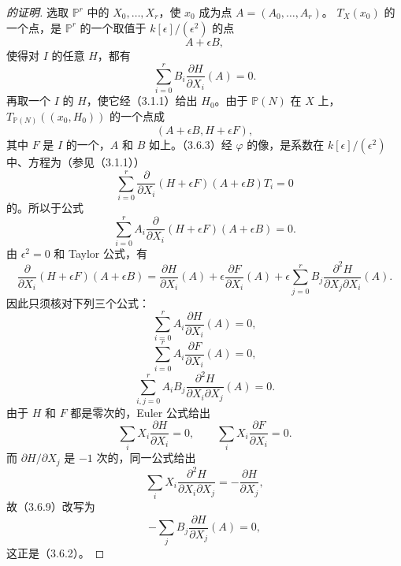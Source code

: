 \begin{proof}[的证明]
选取 $\mathbb P^r$ 中的 $X_0,\ldots,X_r$，使 $x_0$ 成为点 $A=(A_0,\ldots,A_r)$。
$T_X(x_0)$ 的一个点，是 $\mathbb P^r$ 的一个取值于 $k[\epsilon]/(\epsilon^2)$ 的点
\[
A+\epsilon B,\tag{3.6.1}
\]
使得对 $I$ 的任意 $H$，都有
\[
\sum_{i=0}^{r}B_i\frac{\partial H}{\partial X_i}(A)=0.\tag{3.6.2}
\]
再取一个 $I$ 的 $H$，使它经（3.1.1）给出 $H_0$。由于 $\mathbb P(N)$ 在 $X$ 上，$T_{\mathbb P(N)}((x_0,H_0))$ 的一个点成
\[
(A+\epsilon B,H+\epsilon F),\tag{3.6.3}
\]
其中 $F$ 是 $I$ 的一个，$A$ 和 $B$ 如上。（3.6.3）经 $\varphi$ 的像，是系数在 $k[\epsilon]/(\epsilon^2)$ 中、方程为（参见（3.1.1））
\[
\sum_{i=0}^{r}\frac{\partial}{\partial X_i}(H+\epsilon F)(A+\epsilon B)T_i=0
\tag{3.6.4}
\]
的。所以于公式
\[
\sum_{i=0}^{r}A_i\frac{\partial}{\partial X_i}(H+\epsilon F)(A+\epsilon B)=0.
\tag{3.6.5}
\]
由 $\epsilon^2=0$ 和 Taylor 公式，有
\[
\frac{\partial}{\partial X_i}(H+\epsilon F)(A+\epsilon B)
=\frac{\partial H}{\partial X_i}(A)+\epsilon\frac{\partial F}{\partial X_i}(A)
+\epsilon\sum_{j=0}^{r}B_j\frac{\partial^2H}{\partial X_j\partial X_i}(A).
\tag{3.6.6}
\]
因此只须核对下列三个公式：
\[
\sum_{i=0}^{r}A_i\frac{\partial H}{\partial X_i}(A)=0,\tag{3.6.7}
\]
\[
\sum_{i=0}^{r}A_i\frac{\partial F}{\partial X_i}(A)=0,\tag{3.6.8}
\]
\[
\sum_{i,j=0}^{r}A_iB_j\frac{\partial^2H}{\partial X_i\partial X_j}(A)=0.
\tag{3.6.9}
\]
由于 $H$ 和 $F$ 都是零次的，Euler 公式给出
\[
\sum_iX_i\frac{\partial H}{\partial X_i}=0,\qquad
\sum_iX_i\frac{\partial F}{\partial X_i}=0.\tag{3.6.10}
\]
而 $\partial H/\partial X_j$ 是 $-1$ 次的，同一公式给出
\[
\sum_iX_i\frac{\partial^2H}{\partial X_i\partial X_j}=-\frac{\partial H}{\partial X_j},
\]
故（3.6.9）改写为
\[
-\sum_j B_j\frac{\partial H}{\partial X_j}(A)=0,\tag{3.6.11}
\]
这正是（3.6.2）。
\end{proof}

